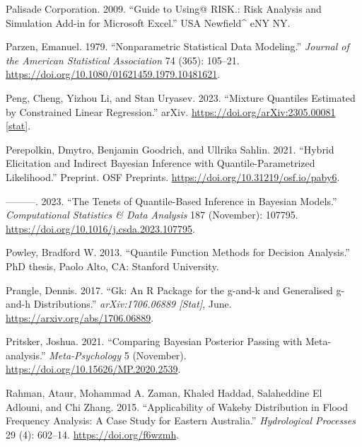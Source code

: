 \documentclass[
]{interact}
\newlength{\cslhangindent}
\newenvironment{CSLReferences}[2] %
 {\begin{list}{}{%
  \setlength{\itemindent}{0pt}
  \setlength{\leftmargin}{0pt}
  \setlength{\parsep}{0pt}
  \ifodd #1
   \setlength{\leftmargin}{\cslhangindent}
   \setlength{\itemindent}{-1\cslhangindent}
  \fi
  \setlength{\itemsep}{#2\baselineskip}}}
 {\end{list}}
\begin{document}
\begin{CSLReferences}{1}{0}
Palisade Corporation. 2009. {``Guide to Using@ {RISK}.: {Risk} Analysis
and Simulation Add-in for {Microsoft Excel}.''} USA Newfield{\^{}} eNY
NY.

Parzen, Emanuel. 1979. {``Nonparametric {Statistical Data Modeling}.''}
\emph{Journal of the American Statistical Association} 74 (365):
105--21. \url{https://doi.org/10.1080/01621459.1979.10481621}.

Peng, Cheng, Yizhou Li, and Stan Uryasev. 2023. {``Mixture {Quantiles
Estimated} by {Constrained Linear Regression}.''} arXiv.
\href{https://doi.org/arXiv:2305.00081\%20\%5Bstat\%5D}{https://doi.org/arXiv:2305.00081
{[}stat{]}}.

Perepolkin, Dmytro, Benjamin Goodrich, and Ullrika Sahlin. 2021.
{``Hybrid Elicitation and Indirect {Bayesian} Inference with
Quantile-Parametrized Likelihood.''} Preprint. OSF Preprints.
\url{https://doi.org/10.31219/osf.io/paby6}.

---------. 2023. {``The Tenets of Quantile-Based Inference in {Bayesian}
Models.''} \emph{Computational Statistics \& Data Analysis} 187
(November): 107795. \url{https://doi.org/10.1016/j.csda.2023.107795}.

Powley, Bradford W. 2013. {``Quantile Function Methods for Decision
Analysis.''} PhD thesis, Paolo Alto, CA: Stanford University.

Prangle, Dennis. 2017. {``Gk: {An R Package} for the g-and-k and
Generalised g-and-h {Distributions}.''} \emph{arXiv:1706.06889
{[}Stat{]}}, June. \url{https://arxiv.org/abs/1706.06889}.

Pritsker, Joshua. 2021. {``Comparing {Bayesian Posterior Passing} with
{Meta-analysis}.''} \emph{Meta-Psychology} 5 (November).
\url{https://doi.org/10.15626/MP.2020.2539}.

Rahman, Ataur, Mohammad A. Zaman, Khaled Haddad, Salaheddine El Adlouni,
and Chi Zhang. 2015. {``Applicability of {Wakeby} Distribution in Flood
Frequency Analysis: A Case Study for Eastern {Australia}.''}
\emph{Hydrological Processes} 29 (4): 602--14.
\url{https://doi.org/f6wzmh}.


\end{CSLReferences}
\end{document}
